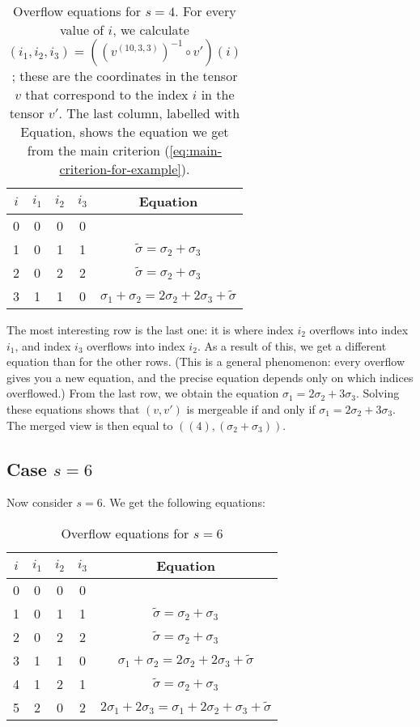 \documentclass{article}
\theoremstyle{definition} %
\begin{document}
\begin{table}[h]
    \centering
    \begin{tabular}{c|c|c|c|c}
        $i$ & $i_1$ & $i_2$ & $i_3$ & Equation \\
        \hline
        0  &  0  & 0  & 0  &  \\
        1  &  0  & 1  & 1  &  $\tilde \sigma = \sigma_2 + \sigma_3$  \\
        2  &  0  & 2  & 2  &  $\tilde \sigma = \sigma_2 + \sigma_3$  \\
        3  &  1  & 1  & 0  &  $\sigma_1 + \sigma_2 = 2 \sigma_2 + 2 \sigma_3 + \tilde \sigma$  \\
    \end{tabular}
    \caption{Overflow equations for $s=4$. For every value of $i$, we calculate
    $(i_1, i_2, i_3) = ((v^{(10, 3, 3)})^{-1} \circ v')(i)$; these 
    are the coordinates in the tensor $v$ that correspond to the index $i$ in the tensor $v'$.
    The last column, labelled with Equation, shows the equation we get from the main criterion (\cref{eq:main-criterion-for-example}).
    }
\end{table}

The most interesting row is the last one:
it is where index $i_2$ overflows into index $i_1$, and index $i_3$ overflows into index $i_2$.
As a result of this, we get a different equation than for the other rows.
(This is a general phenomenon: every overflow gives you a new equation, and the precise equation depends only on which indices overflowed.)
From the last row, we obtain the equation $\sigma_1 = 2\sigma_2 + 3\sigma_3$.
Solving these equations shows that $(v, v')$ is mergeable if and only if $\sigma_1 = 2\sigma_2 + 3\sigma_3$.
The merged view is then equal to $((4), (\sigma_2 + \sigma_3))$.

\subsection{Case $s = 6$}

Now consider $s = 6$. We get the following equations:

\begin{table}[h]
    \centering
    \begin{tabular}{c|c|c|c|c}
        $i$ & $i_1$ & $i_2$ & $i_3$ & Equation \\
        \hline
        0  &  0  & 0  & 0  &  \\
        1  &  0  & 1  & 1  &  $\tilde \sigma = \sigma_2 + \sigma_3$  \\
        2  &  0  & 2  & 2  &  $\tilde \sigma = \sigma_2 + \sigma_3$  \\
        3  &  1  & 1  & 0  &  $\sigma_1 + \sigma_2 = 2 \sigma_2 + 2 \sigma_3 + \tilde \sigma$  \\
        4  &  1  & 2  & 1  &  $\tilde \sigma = \sigma_2 + \sigma_3$  \\
        5  &  2  & 0  & 2  &  $2\sigma_1 + 2\sigma_3 = \sigma_1 + 2\sigma_2 + \sigma_3 + \tilde \sigma$  \\
    \end{tabular}
    \caption{Overflow equations for $s=6$}
\end{table}
\end{document}

